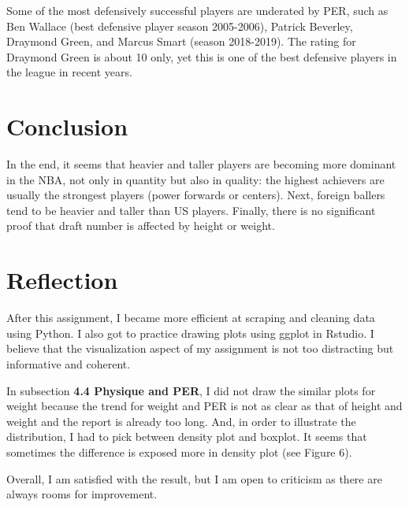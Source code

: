 \documentclass[a4paper,12pt,twoside]{article}
\numberwithin{equation}{section}
\begin{document}
Some of the most defensively successful players are underated by PER, such as Ben Wallace (best defensive player season 2005-2006), Patrick Beverley, Draymond Green, and Marcus Smart (season 2018-2019). The rating for Draymond Green is about 10 only, yet this is one of the best defensive players in the league in recent years.

\section{Conclusion}
In the end, it seems that heavier and taller players are becoming more dominant in the NBA, not only in quantity but also in quality: the highest achievers are usually the strongest players (power forwards or centers). Next, foreign ballers tend to be heavier and taller than US players. Finally, there is no significant proof that draft number is affected by height or weight.

\section{Reflection} 
After this assignment, I became more efficient at scraping and cleaning data using Python. I also got to practice drawing plots using ggplot in Rstudio. I believe that the visualization aspect of my assignment is not too distracting but informative and coherent. 

In subsection \textbf{4.4 Physique and PER}, I did not draw the similar plots for weight because the trend for weight and PER is not as clear as that of height and weight and the report is already too long. And, in order to illustrate the distribution, I had to pick between density plot and boxplot. It seems that sometimes the difference is exposed more in density plot (see Figure 6).

Overall, I am satisfied with the result, but I am open to criticism as there are always rooms for improvement.



 


\end{document}
